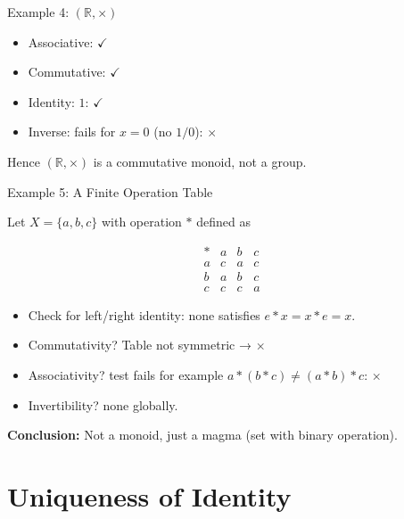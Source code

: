 \begin{frame}{Example 4: $(\mathbb{R}, \times)$}
\begin{block}{}
    \begin{itemize}
  \item Associative: $\checkmark$
  \item Commutative: $\checkmark$
  \item Identity: \(1\): $\checkmark$
  \item Inverse: fails for \(x=0\) (no \(1/0\)): $\times$
\end{itemize}
Hence $(\mathbb{R}, \times)$ is a commutative monoid, not a group.
\end{block}
\end{frame}

\begin{frame}{Example 5: A Finite Operation Table}
\begin{block}{}
    Let \(X = \{a,b,c\}\) with operation $*$ defined as

\[
\begin{array}{c|ccc}
  * & a & b & c \\ \hline
  a & c & a & c \\
  b & a & b & c \\
  c & c & c & a
\end{array}
\]

\begin{itemize}
  \item Check for left/right identity: none satisfies \(e*x = x*e = x\).
  \item Commutativity? Table not symmetric → $\times$
  \item Associativity? test fails for example \(a*(b*c) \ne (a*b)*c\): $\times$
  \item Invertibility? none globally.
\end{itemize}
\textbf{Conclusion:} Not a monoid, just a magma (set with binary operation).
\end{block}
\end{frame}

\section{Uniqueness of Identity}

